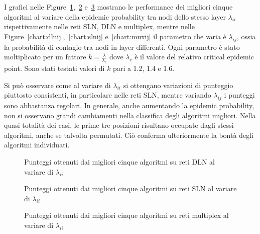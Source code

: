 I grafici nelle Figure~\ref{chart:dlnii},~\ref{chart:slnii} e~\ref{chart:muxii} mostrano le performance dei 
migliori cinque algoritmi al variare della epidemic probability tra nodi dello stesso layer $\lambda_{ii}$ rispettivamente nelle 
reti SLN, DLN e multiplex, mentre nelle Figure~\ref{chart:dlnij},~\ref{chart:slnij} e~\ref{chart:muxij} il parametro 
che varia è $\lambda_{ij}$, ossia
la probabilità di contagio tra nodi in layer differenti.
Ogni parametro è stato moltiplicato per un fattore $k = \frac{\lambda}{\lambda_c}$ dove $\lambda_c$ è il valore del relativo 
critical epidemic point.
Sono stati testati valori di $k$ pari a \num{1.2}, \num{1.4} e \num{1.6}.

Si può osservare come al variare di $\lambda_{ii}$ si ottengano variazioni di punteggio piuttosto consistenti, in particolare nelle 
reti SLN, mentre variando $\lambda_{ij}$ i punteggi sono abbastanza regolari.
In generale, anche aumentando la epidemic probability, non si osservano grandi cambiamenti nella classifica degli algoritmi migliori.
Nella quasi totalità dei casi, le prime tre posizioni risultano occupate dagli stessi algoritmi, anche se talvolta 
permutati. Ciò conferma ulteriormente la bontà degli algoritmi individuati.


\begin{figure}
    \centering
    \resizebox{\textwidth}{!}{}
    
    \caption{Punteggi ottenuti dai migliori cinque algoritmi su reti DLN al variare di $\lambda_{ii}$}
    \label{chart:dlnii}
\end{figure}

\begin{figure}
    \centering
    \resizebox{\textwidth}{!}{}
    
    \caption{Punteggi ottenuti dai migliori cinque algoritmi su reti SLN al variare di $\lambda_{ii}$}
    \label{chart:slnii}
\end{figure}

\begin{figure}
    \centering
    \resizebox{\textwidth}{!}{}
    
    \caption{Punteggi ottenuti dai migliori cinque algoritmi su reti multiplex al variare di $\lambda_{ii}$}
    \label{chart:muxii}
\end{figure}




